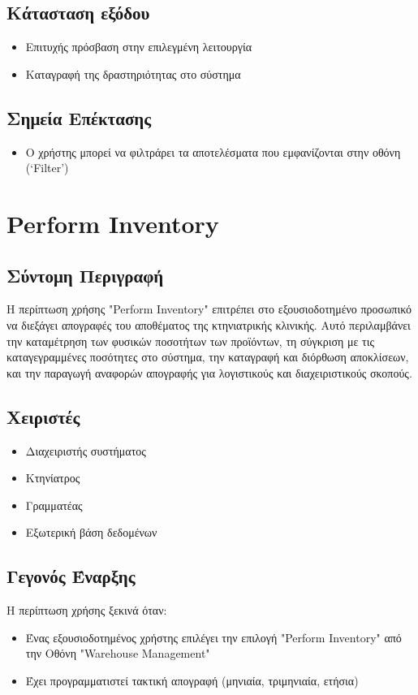 \documentclass[12pt,a4paper,twoside]{book}
\begin{document}
\subsection{Κάτασταση εξόδου} %
\begin{itemize}
  \item Επιτυχής πρόσβαση στην επιλεγμένη λειτουργία
  \item Καταγραφή της δραστηριότητας στο σύστημα %
\end{itemize}

\subsection{Σημεία Επέκτασης}
\begin{itemize}
  \item Ο χρήστης μπορεί να φιλτράρει τα αποτελέσματα που εμφανίζονται στην οθόνη (`Filter') %
\end{itemize}

\section{Perform Inventory}

\subsection{Σύντομη Περιγραφή}
Η περίπτωση χρήσης "Perform Inventory" επιτρέπει στο εξουσιοδοτημένο προσωπικό να διεξάγει απογραφές του αποθέματος της κτηνιατρικής κλινικής. Αυτό περιλαμβάνει την καταμέτρηση των φυσικών ποσοτήτων των προϊόντων, τη σύγκριση με τις καταγεγραμμένες ποσότητες στο σύστημα, την καταγραφή και διόρθωση αποκλίσεων, και την παραγωγή αναφορών απογραφής για λογιστικούς και διαχειριστικούς σκοπούς. %

\subsection{Χειριστές}
\begin{itemize}
  \item Διαχειριστής συστήματος
  \item Κτηνίατρος
  \item Γραμματέας
  \item Εξωτερική βάση δεδομένων %
\end{itemize}

\subsection{Γεγονός Έναρξης}
Η περίπτωση χρήσης ξεκινά όταν:
\begin{itemize}
  \item Ένας εξουσιοδοτημένος χρήστης επιλέγει την επιλογή "Perform Inventory" από την Οθόνη "Warehouse Management" %
  \item Έχει προγραμματιστεί τακτική απογραφή (μηνιαία, τριμηνιαία, ετήσια)
\end{itemize}
\end{document}
